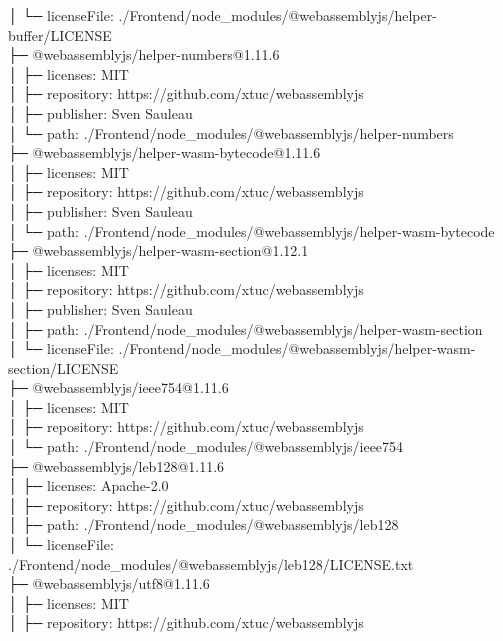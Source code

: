 \documentclass[
    paper=a4,
    twoside=false,
    parskip=half,
    listof=entryprefix,
    listof=totoc,
    index=totoc,
    bibliography=totoc,
    headsepline,
]{scrbook}
\begin{document}
    │  └─ licenseFile: ./Frontend/node\_modules/@webassemblyjs/helper-buffer/LICENSE\\
    ├─ @webassemblyjs/helper-numbers@1.11.6\\
    │  ├─ licenses: MIT\\
    │  ├─ repository: https://github.com/xtuc/webassemblyjs\\
    │  ├─ publisher: Sven Sauleau\\
    │  └─ path: ./Frontend/node\_modules/@webassemblyjs/helper-numbers\\
    ├─ @webassemblyjs/helper-wasm-bytecode@1.11.6\\
    │  ├─ licenses: MIT\\
    │  ├─ repository: https://github.com/xtuc/webassemblyjs\\
    │  ├─ publisher: Sven Sauleau\\
    │  └─ path: ./Frontend/node\_modules/@webassemblyjs/helper-wasm-bytecode\\
    ├─ @webassemblyjs/helper-wasm-section@1.12.1\\
    │  ├─ licenses: MIT\\
    │  ├─ repository: https://github.com/xtuc/webassemblyjs\\
    │  ├─ publisher: Sven Sauleau\\
    │  ├─ path: ./Frontend/node\_modules/@webassemblyjs/helper-wasm-section\\
    │  └─ licenseFile: ./Frontend/node\_modules/@webassemblyjs/helper-wasm-section/LICENSE\\
    ├─ @webassemblyjs/ieee754@1.11.6\\
    │  ├─ licenses: MIT\\
    │  ├─ repository: https://github.com/xtuc/webassemblyjs\\
    │  └─ path: ./Frontend/node\_modules/@webassemblyjs/ieee754\\
    ├─ @webassemblyjs/leb128@1.11.6\\
    │  ├─ licenses: Apache-2.0\\
    │  ├─ repository: https://github.com/xtuc/webassemblyjs\\
    │  ├─ path: ./Frontend/node\_modules/@webassemblyjs/leb128\\
    │  └─ licenseFile: ./Frontend/node\_modules/@webassemblyjs/leb128/LICENSE.txt\\
    ├─ @webassemblyjs/utf8@1.11.6\\
    │  ├─ licenses: MIT\\
    │  ├─ repository: https://github.com/xtuc/webassemblyjs\\
\end{document}
